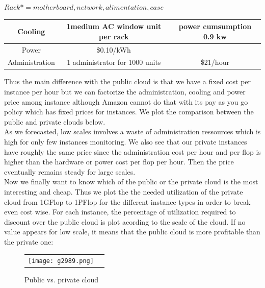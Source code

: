 \documentclass[12pt,journal, a4paper]{IEEEtran}
\begin{document}
$Rack* = motherboard, network,alimentation,case$ 
\begin{table}[H]
\begin{center}

   \begin{tabular}{ | c | c | c |}

     \hline

     Cooling & 1medium AC window unit per rack & power cumsumption 0.9 kw \\ \hline
     
     Power & \$0.10/kWh &  \\ \hline
     
     Administration &  1 administrator for 1000 units &  \$21/hour\\ \hline

     \hline
        
   \end{tabular}
 \end{center} 
\end{table}



Thus the main difference with the public cloud is that we have a fixed cost per instance per hour but we can factorize the administration, cooling and power price among instance although Amazon cannot do that with its pay as you go policy which has fixed prices for instances. We plot the comparison between the public and private clouds below.\\


As we forecasted, low scales involves a waste of administration ressources which is high for only few instances monitoring. We also see that our private instances have roughly the same price since the administration cost per hour and per flop is higher than the hardware or power cost per flop per hour. Then the price eventually remains steady for large scales.\\


Now we finally want to know which of the public or the private cloud is the most interesting and cheap. Thus we plot the the needed utilization of the private cloud from 1GFlop to 1PFlop for the different instance types in order to break even cost wise. For each instance, the percentage of utilization required to discount over the public cloud is plot acording to the scale of the cloud. If no value appears for low scale, it means that the public cloud is more profitable than the private one:

\newpage

\begin{figure}[H]
\centering
\captionsetup{justification=centering}
\begin{tabular}{cc}
\texttt{[image: g2989.png]}
\end{tabular}
\caption{Public vs. private cloud}
\end{figure}
 
\end{document}
